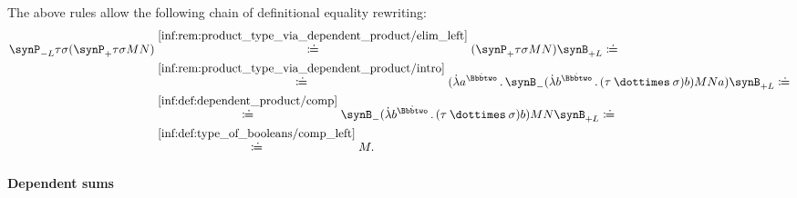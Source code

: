 \begin{remark}
  The above rules allow the following chain of definitional equality rewriting:
  \begin{align*}
    \synP_{-L} \tau \sigma (\synP_+ \tau \sigma M N)
    &\overset {\ref{inf:rem:product_type_via_dependent_product/elim_left}} \syndefeq
    (\synP_+ \tau \sigma M N) \synB_{+L}
    \syndefeq \\ &\overset {\ref{inf:rem:product_type_via_dependent_product/intro}} \syndefeq
    (\qabs {a^{\syn\Bbbtwo}} \synB_- (\qabs {b^{\syn\Bbbtwo}} (\tau \syntimes \sigma) b) M N a) \synB_{+L}
    \syndefeq \\ &\overset {\ref{inf:def:dependent_product/comp}} \syndefeq
    \synB_- (\qabs {b^{\syn\Bbbtwo}} (\tau \syntimes \sigma) b) M N \synB_{+L}
    \syndefeq \\ &\overset {\ref{inf:def:type_of_booleans/comp_left}} \syndefeq
    M.
  \end{align*}
\end{remark}

\paragraph{Dependent sums}

